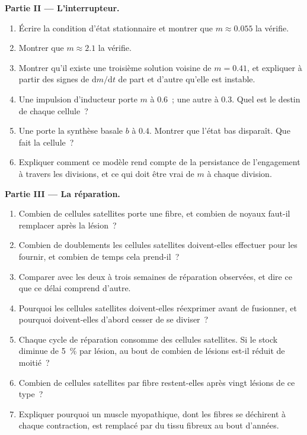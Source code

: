 \begin{problem}
\medskip
\noindent\textbf{Partie II --- L'interrupteur.}
\begin{enumerate}[resume]
  \item Écrire la condition d'état stationnaire et montrer que
        $m \approx
        0.055$ la vérifie.
  \item Montrer que $m \approx 2.1$ la vérifie.
  \item Montrer qu'il existe une troisième solution voisine de
        $m = 0.41$, et expliquer à partir des signes de
        $\mathrm{d}m/\mathrm{d}t$ de part et d'autre qu'elle est
        instable.
  \item Une impulsion d'inducteur porte $m$ à $0.6$~; une autre à $0.3$.
        Quel est le destin de chaque cellule~?
  \item Une  porte la synthèse basale $b$ à $0.4$. Montrer que
        l'état bas disparaît. Que fait la cellule~?
  \item Expliquer comment ce modèle rend compte de la persistance de
        l'engagement à travers les divisions, et ce qui doit être vrai
        de $m$ à chaque division.
\end{enumerate}

\medskip
\noindent\textbf{Partie III --- La réparation.}
\begin{enumerate}[resume]
  \item Combien de cellules satellites porte une fibre, et combien de
        noyaux faut-il remplacer après la lésion~?
  \item Combien de doublements les cellules satellites doivent-elles
        effectuer pour les fournir, et combien de temps cela prend-il~?
  \item Comparer avec les deux à trois semaines de réparation observées,
        et dire ce que ce délai comprend d'autre.
  \item Pourquoi les cellules satellites doivent-elles réexprimer 
        avant de fusionner, et pourquoi doivent-elles d'abord cesser de se
        diviser~?
  \item Chaque cycle de réparation consomme des cellules satellites. Si
        le stock diminue de \qty{5}{\%} par lésion, au bout de combien de
        lésions est-il réduit de moitié~?
  \item Combien de cellules satellites par fibre restent-elles après
        vingt lésions de ce type~?
  \item Expliquer pourquoi un muscle myopathique, dont les fibres se
        déchirent à chaque contraction, est remplacé par du tissu fibreux
        au bout d'années.
\end{enumerate}


\end{problem}
